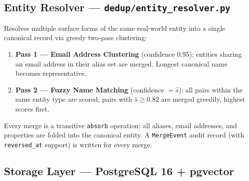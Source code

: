 \documentclass[11pt,a4paper]{article}
\newcommand{\code}[1]{\texttt{\small#1}}
\begin{document}
\subsection{Entity Resolver — \code{dedup/entity\_resolver.py}}

Resolves multiple surface forms of the same real-world entity into a single
canonical record via greedy two-pass clustering:

\begin{enumerate}[leftmargin=*, itemsep=3pt]
  \item \textbf{Pass 1 — Email Address Clustering} (confidence 0.95): entities
    sharing an email address in their alias set are merged.  Longest canonical
    name becomes representative.
  \item \textbf{Pass 2 — Fuzzy Name Matching} (confidence $= \hat{s}$): all
    pairs within the same entity type are scored; pairs with
    $\hat{s} \geq 0.82$ are merged greedily, highest scores first.
\end{enumerate}

Every merge is a transitive \code{absorb} operation: all aliases, email
addresses, and properties are folded into the canonical entity.  A
\code{MergeEvent} audit record (with \code{reversed\_at} support) is written
for every merge.

\subsection{Storage Layer — PostgreSQL 16 + pgvector}
\end{document}

